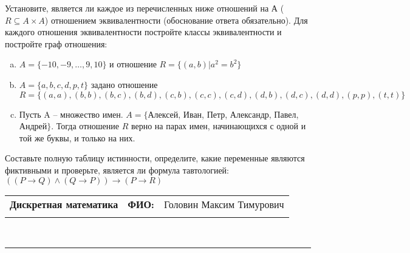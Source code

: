 \documentclass[10pt]{exam}
\newcommand{\class}{Дискретная математика}
\newcommand{\examdate}{}
\begin{document}
\begin{questions}
\question
Установите, является ли каждое из перечисленных ниже отношений на А ($R \subseteq A \times A$) отношением эквивалентности (обоснование ответа обязательно). Для каждого отношения эквивалентности постройте классы 
эквивалентности и постройте граф отношения:
\begin{enumerate} [a)]\setcounter{enumi}{0}
\item $A = \{-10, -9, … , 9, 10\}$ и отношение $R = \{(a,b)|a^{2} = b^{2}\}$
\item $A = \{a, b, c, d, p, t\}$ задано отношение $R = \{(a, a), (b, b), (b, c), (b, d), (c, b), (c, c), (c, d), (d, b), (d, c), (d, d), (p,p), (t,t)\}$
\item Пусть A – множество имен. $A = \{ $Алексей, Иван, Петр, Александр, Павел, Андрей$ \}$. Тогда отношение $R$ верно на парах имен, начинающихся с одной и той же буквы, и только на них.
\end{enumerate}\question Составьте полную таблицу истинности, определите, какие переменные являются фиктивными и проверьте, является ли формула тавтологией:
$(( P \rightarrow Q) \land (Q \rightarrow P)) \rightarrow (P \rightarrow R)$

\end{questions}
\newpage
\begin{flushright}
\begin{tabular}{p{2.8in} r l}
\textbf{\class} & \textbf{ФИО:} &Головин Максим Тимурович
\\

\textbf{\examdate} &&\\
\end{tabular}\\
\end{flushright}
\rule[1ex]{\textwidth}{.1pt}
\end{document}
